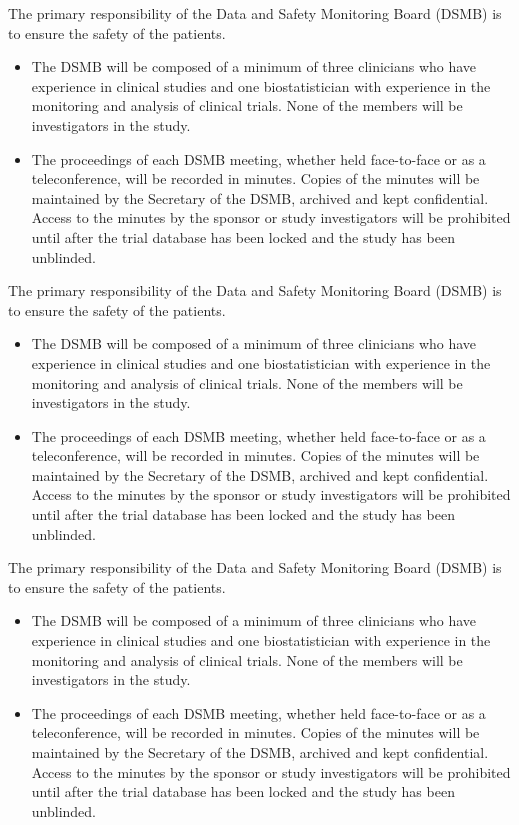 The primary responsibility of the Data and Safety Monitoring Board (DSMB) is to ensure the safety of the patients.
\begin{itemize}
	\item The DSMB will be composed of a minimum of three clinicians who have experience in clinical studies  and one biostatistician with experience in the monitoring and analysis of clinical trials.  None of the members will be investigators in the study.
	\item The proceedings of each DSMB meeting, whether held face-to-face or as a teleconference, will be recorded in minutes.  Copies of the minutes will be maintained by the Secretary of the DSMB, archived and kept confidential.  Access to the minutes by the sponsor or study investigators will be prohibited until after the trial database has been locked and the study has been unblinded.
\end{itemize}

The primary responsibility of the Data and Safety Monitoring Board (DSMB) is to ensure the safety of the patients.
\begin{itemize}
	\item The DSMB will be composed of a minimum of three clinicians who have experience in clinical studies  and one biostatistician with experience in the monitoring and analysis of clinical trials.  None of the members will be investigators in the study.
	\item The proceedings of each DSMB meeting, whether held face-to-face or as a teleconference, will be recorded in minutes.  Copies of the minutes will be maintained by the Secretary of the DSMB, archived and kept confidential.  Access to the minutes by the sponsor or study investigators will be prohibited until after the trial database has been locked and the study has been unblinded.
\end{itemize}

The primary responsibility of the Data and Safety Monitoring Board (DSMB) is to ensure the safety of the patients.
\begin{itemize}
	\item The DSMB will be composed of a minimum of three clinicians who have experience in clinical studies  and one biostatistician with experience in the monitoring and analysis of clinical trials.  None of the members will be investigators in the study.
	\item The proceedings of each DSMB meeting, whether held face-to-face or as a teleconference, will be recorded in minutes.  Copies of the minutes will be maintained by the Secretary of the DSMB, archived and kept confidential.  Access to the minutes by the sponsor or study investigators will be prohibited until after the trial database has been locked and the study has been unblinded.
\end{itemize}

